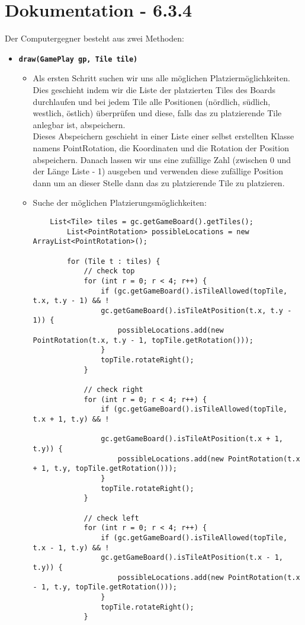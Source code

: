 \section{Dokumentation - 6.3.4}
Der Computergegner besteht aus zwei Methoden:
\begin{itemize}

\item \textbf{\texttt{draw(GamePlay gp, Tile tile)}}
	\begin{itemize}
	
	\item[]
		Als ersten Schritt suchen wir uns alle möglichen Platziermöglichkeiten. \\
		Dies geschieht indem wir die Liste der platzierten Tiles des Boards durchlaufen und bei jedem Tile 
		alle Positionen (nördlich, südlich, westlich, östlich) überprüfen und diese, falls das zu 
		platzierende Tile anlegbar ist, abspeichern. \\
		Dieses Abspeichern geschieht in einer Liste einer selbst erstellten Klasse namens PointRotation, die 
		Koordinaten und die Rotation der Position abspeichern. Danach lassen wir uns eine zufällige Zahl 
		(zwischen 0 und der Länge Liste - 1) ausgeben und verwenden diese zufällige Position dann um an 
		dieser Stelle dann das zu platzierende Tile zu platzieren.
	
	\item Suche der möglichen Platzierungsmöglichkeiten:
	\begin{lstlisting}
	List<Tile> tiles = gc.getGameBoard().getTiles();
		List<PointRotation> possibleLocations = new ArrayList<PointRotation>();

		for (Tile t : tiles) {
			// check top
			for (int r = 0; r < 4; r++) {
				if (gc.getGameBoard().isTileAllowed(topTile, t.x, t.y - 1) && !	
				gc.getGameBoard().isTileAtPosition(t.x, t.y - 1)) {
					possibleLocations.add(new PointRotation(t.x, t.y - 1, topTile.getRotation()));
				}
				topTile.rotateRight();
			}

			// check right
			for (int r = 0; r < 4; r++) {
				if (gc.getGameBoard().isTileAllowed(topTile, t.x + 1, t.y) && !
				
				gc.getGameBoard().isTileAtPosition(t.x + 1, t.y)) {
					possibleLocations.add(new PointRotation(t.x + 1, t.y, topTile.getRotation()));
				}
				topTile.rotateRight();
			}

			// check left
			for (int r = 0; r < 4; r++) {
				if (gc.getGameBoard().isTileAllowed(topTile, t.x - 1, t.y) && !
				gc.getGameBoard().isTileAtPosition(t.x - 1, t.y)) {
					possibleLocations.add(new PointRotation(t.x - 1, t.y, topTile.getRotation()));
				}
				topTile.rotateRight();
			}


\end{lstlisting}
\end{itemize}
\end{itemize}
